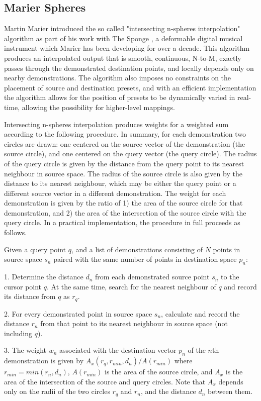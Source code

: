 \documentclass[main.tex]{subfiles}
\begin{document}
\subsection{Marier Spheres}

Martin Marier introduced the so called "intersecting n-spheres interpolation"
algorithm \cite{marier2012nime_nspheres} as part of his work with The Sponge
\cite{marier2010nime_the-sponge}, a deformable digital musical instrument which
Marier has been developing for over a decade. This algorithm produces an
interpolated output that is smooth, continuous, N-to-M, exactly passes through
the demonstrated destination points, and locally depends only on nearby
demonstrations. The algorithm also imposes no constraints on the placement of
source and destination presets, and with an efficient implementation the
algorithm allows for the position of presets to be dynamically varied in
real-time, allowing the possibility for higher-level mappings.

Intersecting n-spheres interpolation produces weights for a weighted sum
according to the following procedure. In summary, for each demonstration two
circles are drawn: one centered on the source vector of the demonstration (the
source circle), and one centered on the query vector (the query circle). The
radius of the query circle is given by the distance from the query point to its
nearest neighbour in source space. The radius of the source circle is also
given by the distance to its nearest neighbour, which may be either the query
point or a different source vector in a different demonstration. The weight for
each demonstration is given by the ratio of 1) the area of the source circle
for that demonstration, and 2) the area of the intersection of the source
circle with the query circle. In a practical implementation, the procedure in
full proceeds as follows.

Given a query point $q$, and a list of demonstrations consisting of $N$ points
in source space $s_n$ paired with the same number of points in destination
space $p_n$:

1. Determine the distance $d_n$ from each demonstrated source point $s_n$ to
the cursor point $q$. At the same time, search for the nearest neighbour of $q$
and record its distance from $q$ as $r_q$.

2. For every demonstrated point in source space $s_n$, calculate and
record the distance $r_n$ from that point to its nearest neighbour in source
space (not including $q$).

3. The weight $w_n$ associated with the destination vector $p_n$ of the $n$th
demonstration is given by $A_x(r_q, r_{min}, d_n) / A(r_{min})$ where $r_{min} = min(r_n, d_n)$, $A(r_{min})$ is
the area of the source circle, and $A_x$ is
the area of the intersection of the source and query circles.
Note that $A_x$ depends only on the radii of the two circles $r_q$ and $r_n$,
and the distance $d_n$ between them.
\end{document}
